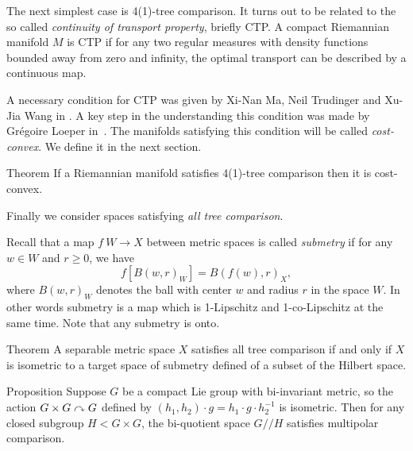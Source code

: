 The next simplest case is 4(1)-tree comparison.
It turns out to be related to the  so called \emph{continuity of transport property}, briefly CTP.
A compact Riemannian manifold $M$ is CTP 
if for any two regular measures with density functions bounded away from zero and infinity,
the optimal transport can be described by a continuous map.



A necessary condition for CTP was given by Xi-Nan Ma, Neil Trudinger and Xu-Jia Wang in \cite{MTW}.
A key step in the understanding this condition was made by Grégoire Loeper in~\cite{loeper}.
The manifolds satisfying this condition will be called \emph{cost-convex}.
We define it in the next section.

\begin{thm}{Theorem}\label{T=>CTIL:CTIL}
If a Riemannian manifold satisfies 4(1)-tree comparison then it is cost-convex.
\end{thm}

Finally we consider spaces satisfying \emph{all tree comparison}.

Recall that a map $f\:W\to X$ between metric spaces is called \emph{submetry} if for any $w\in W$ and $r\ge 0$, we have 
\[f[B(w,r)_W]=B(f(w),r)_X,\]
where $B(w,r)_W$ denotes the ball with center $w$ and radius $r$ in the space $W$.
In other words submetry is a map which is 1-Lipschitz and 1-co-Lipschitz at the same time.
Note that any submetry is onto.

\begin{thm}{Theorem}\label{thm:hilbert-quotient}
A separable metric space $X$ satisfies all tree comparison if and only if
$X$ is isometric to a target space of submetry defined of a subset  of the Hilbert space.
\end{thm}

\begin{thm}{Proposition}\label{prop:group}
Suppose $G$ be a compact Lie group with bi-invariant metric, so the action $G\times G\curvearrowright G$ defined by $(h_1,h_2)\cdot g=h_1\cdot g\cdot  h_2^{-1}$ is isometric. 
Then for any closed subgroup $H<G\times G$, the bi-quotient space $G/\!\!/H$ satisfies multipolar comparison.
\end{thm}